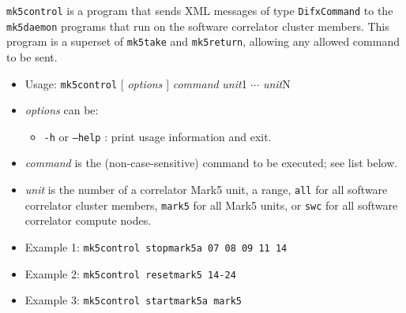 {\tt mk5control} is a program that sends XML messages of type {\tt DifxCommand} to the {\tt mk5daemon} programs that run on the software correlator cluster members.
This program is a superset of {\tt mk5take} and {\tt mk5return}, allowing any allowed command to be sent.

\begin{itemize}
\item[] Usage: {\tt mk5control} $[$ {\em options} $]$ {\em command} {\em unit}1 $\cdots$ {\em unit}N
\item[] {\em options} can be:
\begin{itemize}
\item[] {\tt -h} or {\tt --help} : print usage information and exit.
\end{itemize}
\item[] {\em command} is the (non-case-sensitive) command to be executed; see list below.
\item[] {\em unit} is the number of a correlator Mark5 unit, a range, {\tt all} for all software correlator cluster members, {\tt mark5} for all Mark5 units, or {\tt swc} for all software correlator compute nodes.
\item[] Example 1: {\tt mk5control stopmark5a 07 08 09 11 14}
\item[] Example 2: {\tt mk5control resetmark5 14-24} 
\item[] Example 3: {\tt mk5control startmark5a mark5}
\end{itemize}

